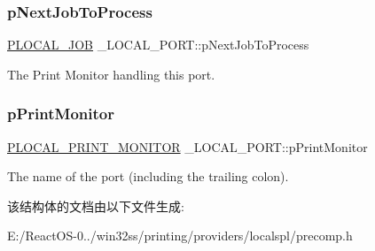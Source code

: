 \subsubsection{\texorpdfstring{p\+Next\+Job\+To\+Process}{pNextJobToProcess}}
{\footnotesize\ttfamily \hyperlink{struct___l_o_c_a_l___j_o_b}{P\+L\+O\+C\+A\+L\+\_\+\+J\+OB} \+\_\+\+L\+O\+C\+A\+L\+\_\+\+P\+O\+R\+T\+::p\+Next\+Job\+To\+Process}

The Print Monitor handling this port. \mbox{\label{struct___l_o_c_a_l___p_o_r_t_a911e86de699d0b3af86a04eb0824eb75}} 
\subsubsection{\texorpdfstring{p\+Print\+Monitor}{pPrintMonitor}}
{\footnotesize\ttfamily \hyperlink{struct___l_o_c_a_l___p_r_i_n_t___m_o_n_i_t_o_r}{P\+L\+O\+C\+A\+L\+\_\+\+P\+R\+I\+N\+T\+\_\+\+M\+O\+N\+I\+T\+OR} \+\_\+\+L\+O\+C\+A\+L\+\_\+\+P\+O\+R\+T\+::p\+Print\+Monitor}

The name of the port (including the trailing colon). 

该结构体的文档由以下文件生成\+:\begin{DoxyCompactItemize}
\item 
E\+:/\+React\+O\+S-\/0../win32ss/printing/providers/localspl/precomp.\+h\end{DoxyCompactItemize}
